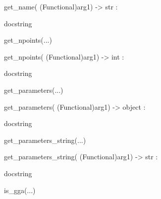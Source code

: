 \documentclass[letterpaper,10pt,english]{sphinxmanual}
\begin{document}
\begin{description}
\begin{description}
\begin{DUlineblock}{0em}
\begin{DUlineblock}{\DUlineblockindent}
\item[] get\_name( (Functional)arg1) -\textgreater{} str :
\item[]
\begin{DUlineblock}{\DUlineblockindent}
\item[] docstring
\item[] 
\end{DUlineblock}
\end{DUlineblock}
\item[] get\_npoints(...)
\item[]
\begin{DUlineblock}{\DUlineblockindent}
\item[] get\_npoints( (Functional)arg1) -\textgreater{} int :
\item[]
\begin{DUlineblock}{\DUlineblockindent}
\item[] docstring
\item[] 
\end{DUlineblock}
\end{DUlineblock}
\item[] get\_parameters(...)
\item[]
\begin{DUlineblock}{\DUlineblockindent}
\item[] get\_parameters( (Functional)arg1) -\textgreater{} object :
\item[]
\begin{DUlineblock}{\DUlineblockindent}
\item[] docstring
\item[] 
\end{DUlineblock}
\end{DUlineblock}
\item[] get\_parameters\_string(...)
\item[]
\begin{DUlineblock}{\DUlineblockindent}
\item[] get\_parameters\_string( (Functional)arg1) -\textgreater{} str :
\item[]
\begin{DUlineblock}{\DUlineblockindent}
\item[] docstring
\item[] 
\end{DUlineblock}
\end{DUlineblock}
\item[] is\_gga(...)
\item[]
\begin{DUlineblock}{\DUlineblockindent}

\end{DUlineblock}
\end{DUlineblock}
\end{description}
\end{description}
\end{document}
